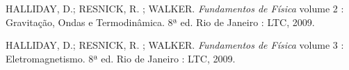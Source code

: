 \documentclass[a4paper,11pt]{article}
\begin{document}
\begin{thebibliography}{9}
  		HALLIDAY, D.; RESNICK, R. ; WALKER.
  		\emph{Fundamentos de Física} volume 2 : Gravitação, Ondas e Termodinâmica.
 		 8ª ed.
 		 Rio de Janeiro : LTC, 2009.
    
  		HALLIDAY, D.; RESNICK, R. ; WALKER.
  		\emph{Fundamentos de Física} volume 3 : Eletromagnetismo.
 		 8ª ed.
 		 Rio de Janeiro : LTC, 2009.

\end{thebibliography}
\end{document}
